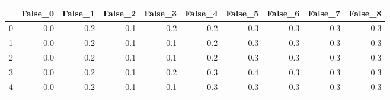 \begin{tabular}{lrrrrrrrrr}
\toprule
{} &  False\_0 &  False\_1 &  False\_2 &  False\_3 &  False\_4 &  False\_5 &  False\_6 &  False\_7 &  False\_8 \\ \hline
\midrule
0 &      0.0 &      0.2 &      0.1 &      0.2 &      0.2 &      0.3 &      0.3 &      0.3 &      0.3 \\ \hline
1 &      0.0 &      0.2 &      0.1 &      0.1 &      0.2 &      0.3 &      0.3 &      0.3 &      0.3 \\ \hline
2 &      0.0 &      0.2 &      0.1 &      0.1 &      0.2 &      0.3 &      0.3 &      0.3 &      0.3 \\ \hline
3 &      0.0 &      0.2 &      0.1 &      0.2 &      0.3 &      0.4 &      0.3 &      0.3 &      0.3 \\ \hline
4 &      0.0 &      0.2 &      0.1 &      0.1 &      0.3 &      0.3 &      0.3 &      0.3 &      0.3 \\ \hline
\bottomrule
\end{tabular}
